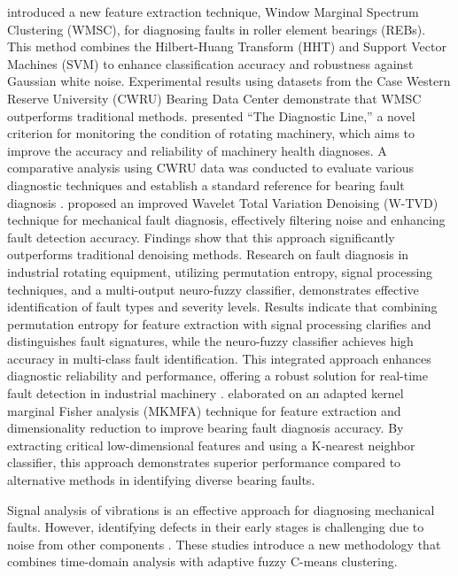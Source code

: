 \documentclass[sn-basic,pdflatex]{sn-jnl}
\theoremstyle{remark}
\theoremstyle{definition}
\begin{document}
\citet{WOS:000365686400021} introduced a new feature extraction
technique, Window Marginal Spectrum Clustering (WMSC), for diagnosing
faults in roller element bearings (REBs). This method combines the
Hilbert-Huang Transform (HHT) and Support Vector Machines (SVM) to
enhance classification accuracy and robustness against Gaussian white
noise. Experimental results using datasets from the Case Western Reserve
University (CWRU) Bearing Data Center demonstrate that WMSC outperforms
traditional methods. \citet{WOS:000366534900022} presented ``The
Diagnostic Line,'' a novel criterion for monitoring the condition of
rotating machinery, which aims to improve the accuracy and reliability
of machinery health diagnoses. A comparative analysis using CWRU data
was conducted to evaluate various diagnostic techniques and establish a
standard reference for bearing fault diagnosis
\citep{WOS:000357230900007}. \citet{WOS:000385104500001} proposed an
improved Wavelet Total Variation Denoising (W-TVD) technique for
mechanical fault diagnosis, effectively filtering noise and enhancing
fault detection accuracy. Findings show that this approach significantly
outperforms traditional denoising methods. Research on fault diagnosis
in industrial rotating equipment, utilizing permutation entropy, signal
processing techniques, and a multi-output neuro-fuzzy classifier,
demonstrates effective identification of fault types and severity
levels. Results indicate that combining permutation entropy for feature
extraction with signal processing clarifies and distinguishes fault
signatures, while the neuro-fuzzy classifier achieves high accuracy in
multi-class fault identification. This integrated approach enhances
diagnostic reliability and performance, offering a robust solution for
real-time fault detection in industrial machinery \citep{Rajabi2022}.
\citet{WOS:000392016300001} elaborated on an adapted kernel marginal
Fisher analysis (MKMFA) technique for feature extraction and
dimensionality reduction to improve bearing fault diagnosis accuracy. By
extracting critical low-dimensional features and using a K-nearest
neighbor classifier, this approach demonstrates superior performance
compared to alternative methods in identifying diverse bearing faults.

Signal analysis of vibrations is an effective approach for diagnosing
mechanical faults. However, identifying defects in their early stages is
challenging due to noise from other components
\citep{WOS:000369301600001, WOS:000367992900001}. These studies
introduce a new methodology that combines time-domain analysis with
adaptive fuzzy C-means clustering.
\end{document}
